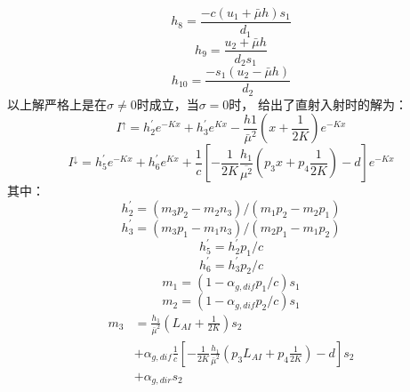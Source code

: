 \begin{equation}
h_{8}=\frac{-c\left(u_{1}+\bar{\mu} h\right) s_{1}}{d_{1}}
\end{equation}
\begin{equation}
h_{9}=\frac{u_{2}+\bar{\mu} h}{d_{2} s_{1}}
\end{equation}
\begin{equation}
h_{10}=\frac{-s_{1}\left(u_{2}-\bar{\mu} h\right)}{d_{2}}
\end{equation}
以上解严格上是在$\sigma \neq 0$时成立，当$\sigma = 0$时，\citet{dai2004two} 给出了直射入射时的解为：
\begin{equation}
I^{\uparrow}=h_{2}^{\prime} e^{-K x}+h_{3}^{\prime} e^{K x}-\frac{h 1}{\bar{\mu}^{2}}\left(x+\frac{1}{2 K}\right) e^{-K x}
\end{equation}
\begin{equation}
I^{\downarrow}=h_{5}^{\prime} e^{-K x}+h_{6}^{\prime} e^{K x}+\frac{1}{c}\left[-\frac{1}{2 K}
 \frac{h_{1}}{\overline{\mu^{2}}}\left(p_{3} x+p_{4} \frac{1}{2 K}\right)-d\right] e^{-K x}
\end{equation}
其中：
\begin{equation}
h_{2}^{\prime}=\left(m_{3} p_{2}-m_{2} n_{3}\right) /\left(m_{1} p_{2}-m_{2} p_{1}\right)
\end{equation}
\begin{equation}
h_{3}^{\prime}=\left(m_{3} p_{1}-m_{1} n_{3}\right) /\left(m_{2} p_{1}-m_{1} p_{2}\right)
\end{equation}
\begin{equation}
h_{5}^{\prime}=h_{2}^{\prime} p_{1} / c
\end{equation}
\begin{equation}
h_{6}^{\prime}=h_{3}^{\prime} p_{2} / c
\end{equation}
\begin{equation}
m_{1}=\left(1-\alpha_{g, dif} p_{1} / c\right) s_{1}
\end{equation}
\begin{equation}
m_{2}=\left(1-\alpha_{g, dif } p_{2} / c\right) s_{1}
\end{equation}
\begin{equation}
\begin{aligned} 
m_{3} &=\frac{h_{1}}{\bar{\mu}^{2}}\left(L_{AI}+\frac{1}{2 K}\right) s_{2} \\ 
           &+\alpha_{g, dif}\frac{1}{c}\left[-\frac{1}{2 K} \frac{h_{1}}{\bar{\mu}^{2}}\left(p_{3} L_{AI}+p_{4} \frac{1}{2 K}\right)-d\right] s_{2} \\ 
           &+\alpha_{g, dir} s_{2} 
 \end{aligned}
\end{equation}
